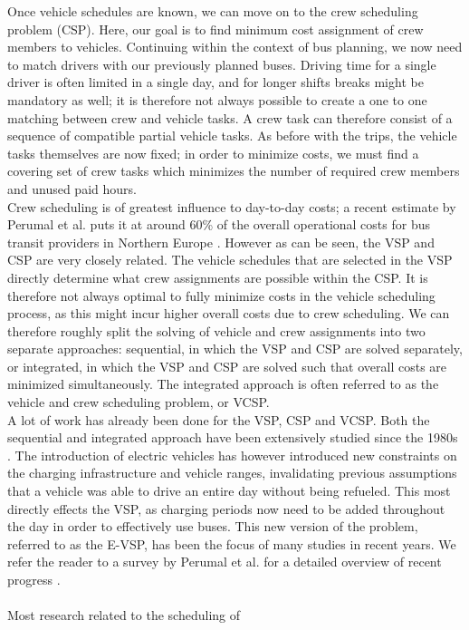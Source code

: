 \documentclass[]{book}
\begin{document}
Once vehicle schedules are known, we can move on to the crew scheduling problem (CSP). Here, our goal is to find minimum cost assignment of crew members to vehicles. Continuing within the context of bus planning, we now need to match drivers with our previously planned buses. Driving time for a single driver is often limited in a single day, and for longer shifts breaks might be mandatory as well; it is therefore not always possible to create a one to one matching between crew and vehicle tasks. A crew task can therefore consist of a sequence of compatible partial vehicle tasks. As before with the trips, the vehicle tasks themselves are now fixed; in order to minimize costs, we must find a covering set of crew tasks which minimizes the number of required crew members and unused paid hours. \\ 
Crew scheduling is of greatest influence to day-to-day costs; a recent estimate by Perumal et al. puts it at around 60\% of the overall operational costs for bus transit providers in Northern Europe \cite{Perumal2019Crew}. However as can be seen, the VSP and CSP are very closely related. The vehicle schedules that are selected in the VSP directly determine what crew
assignments are possible within the CSP. It is therefore not always optimal to
fully minimize costs in the vehicle scheduling process, as this might incur
higher overall costs due to crew scheduling. We can therefore roughly split the
solving of vehicle and crew assignments into two separate approaches:
sequential, in which the VSP and CSP are solved separately, or integrated, in
which the VSP and CSP are solved such that overall costs are minimized
simultaneously. The integrated approach is often referred to as the vehicle and
crew scheduling problem, or VCSP. \\
A lot of work has already been done for the VSP, CSP and VCSP.
Both the sequential and integrated approach have been extensively studied since the 1980s \cite{Bodin1983}. The
introduction of electric vehicles has however introduced new constraints on the charging infrastructure and vehicle ranges, invalidating previous assumptions that a vehicle was able to drive an entire day without being refueled. This most directly effects the VSP, as
charging periods now need to be added throughout the day in order to
effectively use buses. This new version of the problem, referred to as the
E-VSP, has been the focus of many studies in recent years. We refer the reader
to a survey by Perumal et al. for a detailed overview of recent progress
\cite{Perumal2022LitRev}. \\\\ Most research related to the scheduling of
\end{document}
